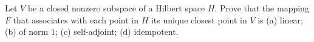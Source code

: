 Let $V$ be a closed nonzero subspace of a Hilbert space $H$. Prove
that the mapping $F$ that associates with each point in $H$ its unique
closest point in $V$ is (a) linear; (b) of norm $1$; (c) self-adjoint;
(d) idempotent.
